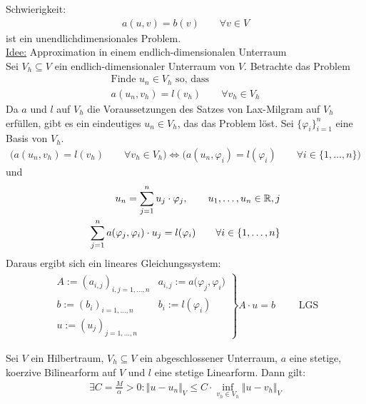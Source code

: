 Schwierigkeit:
\begin{align*}
	a(u,v)=b(v)\qquad\forall v\in V
\end{align*}
ist ein unendlichdimensionales Problem.\\
\underline{Idee:} Approximation in einem endlich-dimensionalen Unterraum\\
Sei $V_h\subseteq V$ ein endlich-dimensionaler Unterraum von $V$.
Betrachte das Problem
\begin{align*}
	\text{Finde }u_n\in V_h \text{ so, dass }\qquad \\
	a(u_n,v_h)=l(v_h)\qquad\forall v_h\in V_h
\end{align*}
Da $a$ und $l$ auf $V_h$ die Voraussetzungen des Satzes von Lax-Milgram auf $V_h$ erfüllen, gibt es ein eindeutiges $u_n\in V_h$, das das Problem löst.\nl
Sei $\lbrace\varphi_i\rbrace_{i=1}^n$ eine Basis von $V_h$.
\begin{align*}
	\Big(a(u_n,v_h)=l(v_h)\qquad\forall v_h\in V_h\Big)\Longleftrightarrow
	\Big(a(u_n,\varphi_i)=l(\varphi_i)\qquad\forall i\in\lbrace1,\ldots,n\rbrace\Big)
\end{align*}
und
\begin{align*}
	u_n=\sum\limits_{j=1}^n u_j\cdot\varphi_j,\qquad u_1,\ldots,u_n\in\mathbb{R},j\\
	\sum\limits_{j=1}^n a(\varphi_j,\varphi_i)\cdot u_j=l(\varphi_i)\qquad\forall i\in\lbrace1,\ldots,n\rbrace\\
\end{align*}
Daraus ergibt sich ein lineares Gleichungssystem:
\begin{align*}
	\left.\begin{array}{ll}
		A:=(a_{i,j})_{i,j=1,\ldots,n} &a_{i,j}:=a\big(\varphi_j,\varphi_i\big)\\
		b:=(b_i)_{i=1,\ldots,n} &b_i:=l(\varphi_i)\\
		u:=(u_j)_{j=1,\ldots,n}
	\end{array}\right\rbrace A\cdot u=b\qquad\text{ LGS}
\end{align*}

\begin{theorem}\enter\label{theorem2.2CeasLemma}
	Sei $V$ ein Hilbertraum, $V_h\subseteq V$ ein abgeschlossener Unterraum, $a$ eine stetige, koerzive Bilinearform auf $V$ und $l$ eine stetige Linearform.
	Dann gilt:
	\begin{align*}
		\exists C=\frac{M}{\alpha}>0:\Vert u-u_n\Vert_V\leq C\cdot\inf\limits_{v_h\in V_h}\Vert u-v_h\Vert_V
	\end{align*}
\end{theorem}

